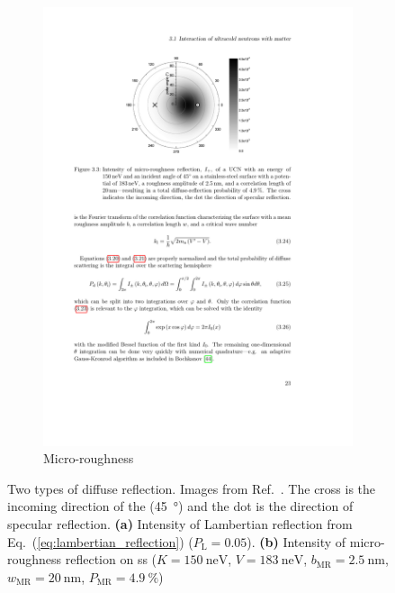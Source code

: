 \begin{figure}
\begin{subfigure}{.5\textwidth}
  \includegraphics[width=\textwidth]{figures/schreyer_microroughness.pdf}
  \caption{Micro-roughness}\label{subfig:microroughness_diffuse}
\end{subfigure}
\caption[Two types of diffuse reflection]
{Two types of diffuse reflection. Images from Ref.~\cite{schreyer_thesis}. The cross is the incoming direction of the \ucn (\qty{45}{\degree}) and the dot is the direction of specular reflection. \textbf{(a)} Intensity of Lambertian reflection from Eq.~(\ref{eq:lambertian_reflection}) ($P_\text{L}=0.05$). \textbf{(b)} Intensity of micro-roughness reflection on \acrshort{ss} ($K=\qty{150}{\nano\eV}$, $V=\qty{183}{\nano\eV}$, $b_\text{MR}=\qty{2.5}{\nano\meter}$, $w_\text{MR}=\qty{20}{\nano\meter}$, $P_\text{MR}=\qty{4.9}{\percent}$)}
\label{fig:diffuse_reflection}
\end{figure}


